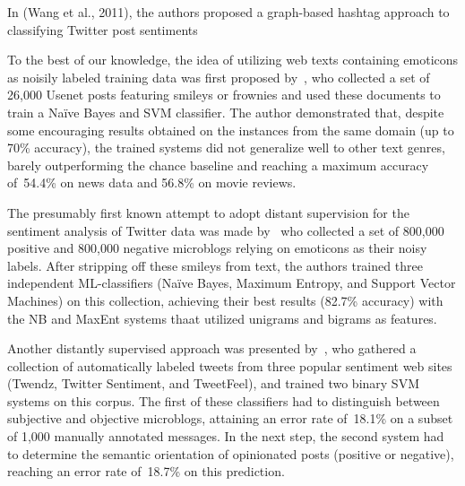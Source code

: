 In (Wang et al., 2011), the authors
proposed a graph-based hashtag approach to classifying Twitter post
sentiments

\todo[inline]{}

To the best of our knowledge, the idea of utilizing web texts
containing emoticons as noisily labeled training data was first
proposed by~\citet{Read:05}, who collected a set of 26,000 Usenet
posts featuring smileys or frownies and used these documents to train
a Na{\"i}ve Bayes and SVM classifier.  The author demonstrated that,
despite some encouraging results obtained on the instances from the
same domain (up to 70\% accuracy), the trained systems did not
generalize well to other text genres, barely outperforming the chance
baseline and reaching a maximum accuracy of~54.4\% on news data and
56.8\% on movie reviews.

The presumably first known attempt to adopt distant supervision for
the sentiment analysis of Twitter data was made by~\citet{Go:09} who
collected a set of 800,000 positive and 800,000 negative microblogs
relying on emoticons as their noisy labels.  After stripping off these
smileys from text, the authors trained three independent
ML-classifiers (Na{\"i}ve Bayes, Maximum Entropy, and Support Vector
Machines) on this collection, achieving their best results (82.7\%
accuracy) with the NB and MaxEnt systems thaat utilized unigrams and
bigrams as features.

Another distantly supervised approach was presented
by~\citet{Barbosa:10}, who gathered a collection of automatically
labeled tweets from three popular sentiment web sites (Twendz, Twitter
Sentiment, and TweetFeel), and trained two binary SVM systems on this
corpus.  The first of these classifiers had to distinguish between
subjective and objective microblogs, attaining an error rate of~18.1\%
on a subset of 1,000 manually annotated messages.  In the next step,
the second system had to determine the semantic orientation of
opinionated posts (positive or negative), reaching an error rate
of~18.7\% on this prediction.

